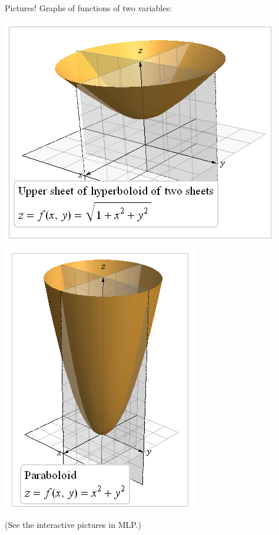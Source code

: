 \documentclass[12pt]{beamer}
\theoremstyle{plain}
\theoremstyle{definition}
\begin{document}
\begin{frame}[allowframebreaks]{\small Pictures!}{}
Graphs of functions of two variables:

\vspace{-2.75pc}
\begin{center}
\includegraphics[scale=0.45]{12-2functionsHyp}
\hfill
\includegraphics[scale=0.45]{12-2functionsParab}
\end{center}

\vspace{-1pc}
\hfill{\footnotesize (See the interactive pictures in MLP.)}


\end{frame}
\end{document}
